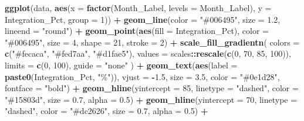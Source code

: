 \documentclass[
]{article}
\newenvironment{Shaded}{\begin{snugshade}}{\end{snugshade}}
\newcommand{\AttributeTok}[1]{\textcolor[rgb]{0.13,0.29,0.53}{#1}}
\newcommand{\DecValTok}[1]{\textcolor[rgb]{0.00,0.00,0.81}{#1}}
\newcommand{\FloatTok}[1]{\textcolor[rgb]{0.00,0.00,0.81}{#1}}
\newcommand{\FunctionTok}[1]{\textcolor[rgb]{0.13,0.29,0.53}{\textbf{#1}}}
\newcommand{\NormalTok}[1]{#1}
\newcommand{\SpecialCharTok}[1]{\textcolor[rgb]{0.81,0.36,0.00}{\textbf{#1}}}
\newcommand{\StringTok}[1]{\textcolor[rgb]{0.31,0.60,0.02}{#1}}
\begin{document}
\begin{Shaded}
\begin{Highlighting}[]
      \FunctionTok{ggplot}\NormalTok{(data, }\FunctionTok{aes}\NormalTok{(}\AttributeTok{x =} \FunctionTok{factor}\NormalTok{(Month\_Label, }\AttributeTok{levels =}\NormalTok{ Month\_Label),}
                       \AttributeTok{y =}\NormalTok{ Integration\_Pct, }\AttributeTok{group =} \DecValTok{1}\NormalTok{)) }\SpecialCharTok{+}
        \FunctionTok{geom\_line}\NormalTok{(}\AttributeTok{color =} \StringTok{"\#006495"}\NormalTok{, }\AttributeTok{size =} \FloatTok{1.2}\NormalTok{, }\AttributeTok{lineend =} \StringTok{"round"}\NormalTok{) }\SpecialCharTok{+}
        \FunctionTok{geom\_point}\NormalTok{(}\FunctionTok{aes}\NormalTok{(}\AttributeTok{fill =}\NormalTok{ Integration\_Pct),}
                   \AttributeTok{color =} \StringTok{"\#006495"}\NormalTok{,}
                   \AttributeTok{size =} \DecValTok{4}\NormalTok{,}
                   \AttributeTok{shape =} \DecValTok{21}\NormalTok{,}
                   \AttributeTok{stroke =} \DecValTok{2}\NormalTok{) }\SpecialCharTok{+}
        \FunctionTok{scale\_fill\_gradientn}\NormalTok{(}
          \AttributeTok{colors =} \FunctionTok{c}\NormalTok{(}\StringTok{"\#fecaca"}\NormalTok{, }\StringTok{"\#fed7aa"}\NormalTok{, }\StringTok{"\#d1fae5"}\NormalTok{),}
          \AttributeTok{values =}\NormalTok{ scales}\SpecialCharTok{::}\FunctionTok{rescale}\NormalTok{(}\FunctionTok{c}\NormalTok{(}\DecValTok{0}\NormalTok{, }\DecValTok{70}\NormalTok{, }\DecValTok{85}\NormalTok{, }\DecValTok{100}\NormalTok{)),}
          \AttributeTok{limits =} \FunctionTok{c}\NormalTok{(}\DecValTok{0}\NormalTok{, }\DecValTok{100}\NormalTok{),}
          \AttributeTok{guide =} \StringTok{"none"}
\NormalTok{        ) }\SpecialCharTok{+}
        \FunctionTok{geom\_text}\NormalTok{(}\FunctionTok{aes}\NormalTok{(}\AttributeTok{label =} \FunctionTok{paste0}\NormalTok{(Integration\_Pct, }\StringTok{"\%"}\NormalTok{)),}
                  \AttributeTok{vjust =} \SpecialCharTok{{-}}\FloatTok{1.5}\NormalTok{,}
                  \AttributeTok{size =} \FloatTok{3.5}\NormalTok{,}
                  \AttributeTok{color =} \StringTok{"\#0e1d28"}\NormalTok{,}
                  \AttributeTok{fontface =} \StringTok{"bold"}\NormalTok{) }\SpecialCharTok{+}
        \FunctionTok{geom\_hline}\NormalTok{(}\AttributeTok{yintercept =} \DecValTok{85}\NormalTok{, }\AttributeTok{linetype =} \StringTok{"dashed"}\NormalTok{, }\AttributeTok{color =} \StringTok{"\#15803d"}\NormalTok{, }\AttributeTok{size =} \FloatTok{0.7}\NormalTok{, }\AttributeTok{alpha =} \FloatTok{0.5}\NormalTok{) }\SpecialCharTok{+}
        \FunctionTok{geom\_hline}\NormalTok{(}\AttributeTok{yintercept =} \DecValTok{70}\NormalTok{, }\AttributeTok{linetype =} \StringTok{"dashed"}\NormalTok{, }\AttributeTok{color =} \StringTok{"\#dc2626"}\NormalTok{, }\AttributeTok{size =} \FloatTok{0.7}\NormalTok{, }\AttributeTok{alpha =} \FloatTok{0.5}\NormalTok{) }\SpecialCharTok{+}

\end{Highlighting}
\end{Shaded}
\end{document}
